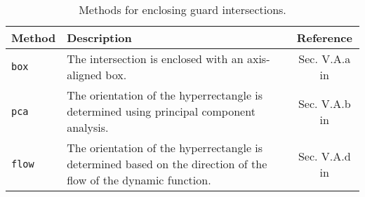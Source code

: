 \begin{table*}[h]
    \centering
    \caption{Methods for enclosing guard intersections.}
    \label{tab:enclose}
    \begin{tabular}{l p{10cm} c}
        \toprule
        \textbf{Method} & \textbf{Description}                                                                                            & \textbf{Reference}                \\
        \midrule
        \texttt{box}    & The intersection is enclosed with an axis-aligned box.                                                          & Sec. V.A.a in \cite{Althoff2011f} \\
        \texttt{pca}    & The orientation of the hyperrectangle is determined using principal component analysis. & Sec. V.A.b in \cite{Althoff2011f} \\
        \texttt{flow}   & The orientation of the hyperrectangle is determined based on the direction of the flow of the dynamic function. & Sec. V.A.d in \cite{Althoff2011f} \\
        \bottomrule
    \end{tabular}
\end{table*}


